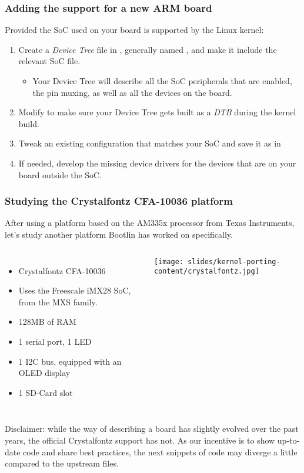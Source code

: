 \begin{frame}
  \frametitle{Adding the support for a new ARM board}
  Provided the SoC used on your board is supported by the Linux kernel:
  \begin{enumerate}
  \item Create a {\em Device Tree} file in ,
    generally named , and make it
    include the relevant SoC  file.
    \begin{itemize}
    \item Your Device Tree will describe all the SoC peripherals that
      are enabled, the pin muxing, as well as all the devices on the
      board.
    \end{itemize}
  \item Modify  to make sure your
    Device Tree gets built as a {\em DTB} during the kernel build.
  \item Tweak an existing configuration that matches your SoC and save
    it as  in 
  \item If needed, develop the missing device drivers for the devices
    that are on your board outside the SoC.
  \end{enumerate}
\end{frame}

\begin{frame}
  \frametitle{Studying the Crystalfontz CFA-10036 platform}
  After using a platform based on the AM335x processor from Texas
  Instruments, let's study another platform Bootlin
  has worked on specifically.
  \begin{columns}
    \begin{itemize}
    \item Crystalfontz CFA-10036
    \item Uses the Freescale iMX28 SoC, from the MXS family.
    \item 128MB of RAM
    \item 1 serial port, 1 LED
    \item 1 I2C bus, equipped with an OLED display
    \item 1 SD-Card slot
    \end{itemize}
    \texttt{[image: slides/kernel-porting-content/crystalfontz.jpg]}
  \end{columns}
  \bigskip
  Disclaimer: while the way of describing a board has slightly evolved
  over the past years, the official Crystalfontz support has not. As our
  incentive is to show up-to-date code and share best practices, the
  next snippets of code may diverge a little compared to the upstream
  files.
\end{frame}

